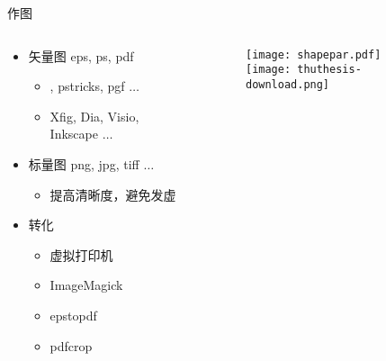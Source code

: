 \begin{frame}{作图}
  \begin{columns}[c]
    \begin{column}{.5\textwidth}
  \begin{itemize}
  \item 矢量图 eps, ps, pdf
    \begin{itemize}
    \item \MP, pstricks, pgf $\ldots$
    \item Xfig, Dia, \alert{Visio}, \alert{Inkscape} $\ldots$
    \end{itemize}
  \item 标量图 png, jpg, tiff $\ldots$
    \begin{itemize}
      \item 提高清晰度，避免发虚
    \end{itemize}
  \item 转化
    \begin{itemize}
    \item 虚拟打印机
    \item ImageMagick
    \item epstopdf
    \item pdfcrop
    \end{itemize}
  \end{itemize}
    \end{column}
    \begin{column}{.4\textwidth}
\begin{figure}[h]
  \centering
\texttt{[image: shapepar.pdf]}\\\vspace{1cm}
\texttt{[image: thuthesis-download.png]}
\end{figure}
    \end{column}
  \end{columns}
\end{frame}


